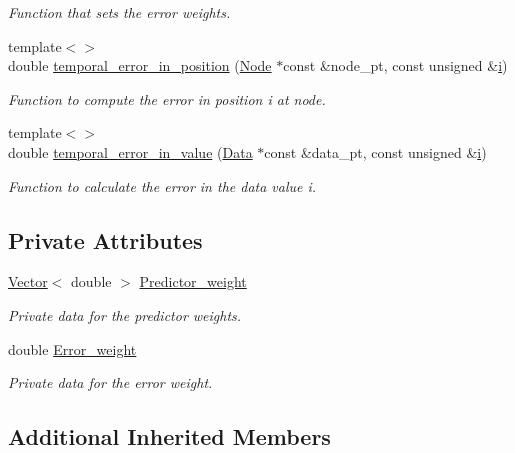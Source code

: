 \begin{DoxyCompactItemize}
\begin{DoxyCompactList}\small\item\em Function that sets the error weights. \end{DoxyCompactList}\item 
{\footnotesize template$<$$>$ }\\double \hyperlink{classoomph_1_1BDF_a858e48dd8330b67d2693a2c785adc75b}{temporal\+\_\+error\+\_\+in\+\_\+position} (\hyperlink{classoomph_1_1Node}{Node} $\ast$const \&node\+\_\+pt, const unsigned \&\hyperlink{cfortran_8h_adb50e893b86b3e55e751a42eab3cba82}{i})
\begin{DoxyCompactList}\small\item\em Function to compute the error in position i at node. \end{DoxyCompactList}\item 
{\footnotesize template$<$$>$ }\\double \hyperlink{classoomph_1_1BDF_ab15c8dbf5716b7cb7dde42550b848528}{temporal\+\_\+error\+\_\+in\+\_\+value} (\hyperlink{classoomph_1_1Data}{Data} $\ast$const \&data\+\_\+pt, const unsigned \&\hyperlink{cfortran_8h_adb50e893b86b3e55e751a42eab3cba82}{i})
\begin{DoxyCompactList}\small\item\em Function to calculate the error in the data value i. \end{DoxyCompactList}\end{DoxyCompactItemize}
\subsection*{Private Attributes}
\begin{DoxyCompactItemize}
\item 
\hyperlink{classoomph_1_1Vector}{Vector}$<$ double $>$ \hyperlink{classoomph_1_1BDF_a8973b856c5829681fd890323e43e03ae}{Predictor\+\_\+weight}
\begin{DoxyCompactList}\small\item\em Private data for the predictor weights. \end{DoxyCompactList}\item 
double \hyperlink{classoomph_1_1BDF_a64fe5c2a1e2872698dd72033d9f0087f}{Error\+\_\+weight}
\begin{DoxyCompactList}\small\item\em Private data for the error weight. \end{DoxyCompactList}\end{DoxyCompactItemize}
\subsection*{Additional Inherited Members}


